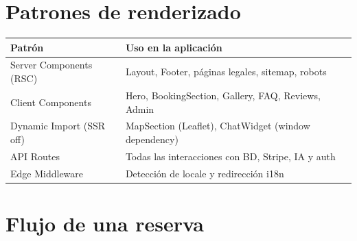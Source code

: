 \documentclass[12pt,a4paper,twoside,openright]{report}
\begin{document}
\section{Patrones de renderizado}

\begin{longtable}{L{4cm} L{8.5cm}}
  \toprule
  \textbf{Patrón} & \textbf{Uso en la aplicación} \\
  \midrule
  Server Components (RSC) & Layout, Footer, páginas legales, sitemap, robots \\
  Client Components & Hero, BookingSection, Gallery, FAQ, Reviews, Admin \\
  Dynamic Import (SSR off) & MapSection (Leaflet), ChatWidget (window dependency) \\
  API Routes & Todas las interacciones con BD, Stripe, IA y auth \\
  Edge Middleware & Detección de locale y redirección i18n \\
  \bottomrule
\end{longtable}

\section{Flujo de una reserva}
\end{document}

